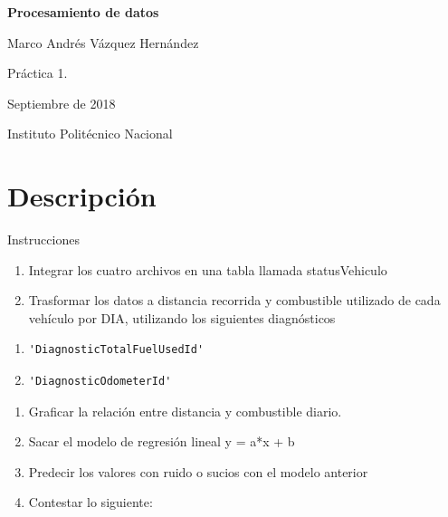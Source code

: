 \documentclass[]{article}
\title{}
\author{}
\date{}
\providecommand{\tightlist}{%
  \setlength{\itemsep}{0pt}\setlength{\parskip}{0pt}}
\begin{document}
\begin{centering}

\vspace*{5 cm}

\Huge

{\bf Procesamiento de datos}

\vspace{3 cm}

\Large
Marco Andrés Vázquez Hernández

\vspace{1 cm}
\normalsize
Práctica 1. 

Septiembre de 2018

\normalsize
Instituto Politécnico Nacional


\end{centering}

\newpage

\section{Descripción}\label{descripcion}

Instrucciones

\begin{enumerate}
\def\labelenumi{\arabic{enumi}.}
\tightlist
\item
  Integrar los cuatro archivos en una tabla llamada statusVehiculo
\item
  Trasformar los datos a distancia recorrida y combustible utilizado de
  cada vehículo por DIA, utilizando los siguientes diagnósticos
\end{enumerate}

\begin{enumerate}
\def\labelenumi{\alph{enumi}.}
\item
\begin{verbatim}
'DiagnosticTotalFuelUsedId'
\end{verbatim}
\item
\begin{verbatim}
'DiagnosticOdometerId'
\end{verbatim}
\end{enumerate}

\begin{enumerate}
\def\labelenumi{\arabic{enumi}.}
\setcounter{enumi}{2}
\tightlist
\item
  Graficar la relación entre distancia y combustible diario.
\item
  Sacar el modelo de regresión lineal y = a*x + b
\item
  Predecir los valores con ruido o sucios con el modelo anterior
\item
  Contestar lo siguiente:
\end{enumerate}
\end{document}
